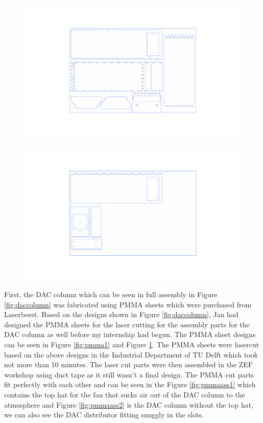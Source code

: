\begin{figure}[H]
\centering
\begin{minipage}{.5\textwidth}
  \centering
  \includegraphics[width=\linewidth]{images/mywork/Sprint1/Lasersheet1.png}
  \label{fig:pmma1}
\end{minipage}%
\begin{minipage}{.5\textwidth}
  \centering
  \includegraphics[width=\linewidth]{images/mywork/Sprint1/Lasersheet2.png}
  \label{fig:pmma2}
\end{minipage}
\end{figure}

First, the DAC column which can be seen in full assembly in Figure \ref{fig:daccolumn} was fabricated using PMMA sheets which were purchased from Laserbeest. Based on the designs shown in Figure \ref{fig:daccolumn}, Jan had designed the PMMA sheets for the laser cutting for the assembly parts for the DAC column as well before my internship had begun. The PMMA sheet designs can be seen in Figure \ref{fig:pmma1} and Figure \ref{fig:pmma2}. The PMMA sheets were lasercut based on the above designs in the Industrial Department of TU Delft which took not more than 10 minutes. 
\bigbreak
The laser cut parts were then assembled in the ZEF workshop using duct tape as it still wasn't a final design. The PMMA cut parts fit perfectly with each other and can be seen in the Figure \ref{fig:pmmaass1} which contains the top hat for the fan that sucks air out of the DAC column to the atmosphere and Figure \ref{fig:pmmaass2} is the DAC column without the top hat, we can also see the DAC distributor fitting snuggly in the slots.  


